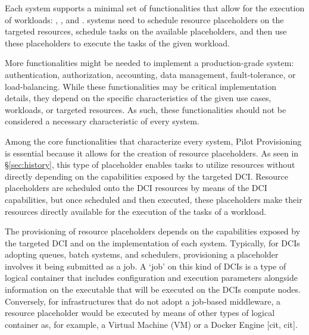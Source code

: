\documentclass{sig-alternate}
\begin{document}
Each \pilot system supports a minimal set of functionalities that allow for the
execution of workloads: , ,
and . \pilot systems need to schedule resource
placeholders on the targeted resources, schedule tasks on the available
placeholders, and then use these placeholders to execute the tasks of the given
workload.

More functionalities might be needed to implement a production-grade \pilot
system: authentication, authorization, accounting, data management,
fault-tolerance, or load-balancing. While these functionalities may be critical
implementation details, they depend on the specific characteristics of the
given use cases, workloads, or targeted resources. As such, these
functionalities should not be considered a necessary characteristic of every
\pilot system.

Among the core functionalities that characterize every \pilot system, Pilot
Provisioning is essential because it allows for the creation of resource
placeholders. As seen in \S\ref{sec:history}, this type of placeholder enables
tasks to utilize resources without directly depending on the capabilities
exposed by the targeted DCI. Resource placeholders are scheduled onto the DCI
resources by means of the DCI capabilities, but once scheduled and then
executed, these placeholders make their resources directly available for the
execution of the tasks of a workload.
 


The provisioning of resource placeholders depends on the capabilities exposed
by the targeted DCI and on the implementation of each \pilot system. Typically,
for DCIs adopting queues, batch systems, and schedulers, provisioning a
placeholder involves it being submitted as a job. A `job' on this kind of DCIs
is a type of logical container that includes configuration and execution
parameters alongside information on the executable that will be executed on the
DCIs compute nodes. Conversely, for infrastructures that do not adopt a
job-based middleware, a resource placeholder would be executed by means of
other types of logical container as, for example, a Virtual Machine (VM) or a
Docker Engine [cit, cit].
\end{document}
